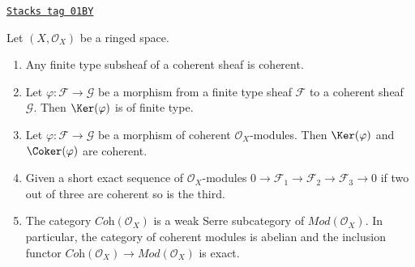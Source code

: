 \begin{lemma}
\label{modules-lemma-coherent-abelian}
\href{https://stacks.math.columbia.edu/tag/01BY}{\texttt{Stacks tag 01BY}}

Let $(X, \mathcal{O}_X)$ be a ringed space.
\begin{enumerate}
\item Any finite type subsheaf of a coherent sheaf is coherent.
\item Let $\varphi : \mathcal{F} \to \mathcal{G}$
be a morphism from a finite type sheaf $\mathcal{F}$
to a coherent sheaf $\mathcal{G}$. Then $\Ker(\varphi)$ is of finite type.
\item Let $\varphi : \mathcal{F} \to \mathcal{G}$ be a morphism
of coherent $\mathcal{O}_X$-modules. Then
$\Ker(\varphi)$ and
$\Coker(\varphi)$ are coherent.
\item Given a short exact sequence of $\mathcal{O}_X$-modules
$0 \to \mathcal{F}_1 \to \mathcal{F}_2 \to \mathcal{F}_3 \to 0$
if two out of three are coherent so is the third.
\item The category $\textit{Coh}(\mathcal{O}_X)$ is a weak Serre subcategory
of $\textit{Mod}(\mathcal{O}_X)$. In particular, the category of
coherent modules is abelian and the inclusion functor
$\textit{Coh}(\mathcal{O}_X) \to \textit{Mod}(\mathcal{O}_X)$
is exact.
\end{enumerate}
\end{lemma}

